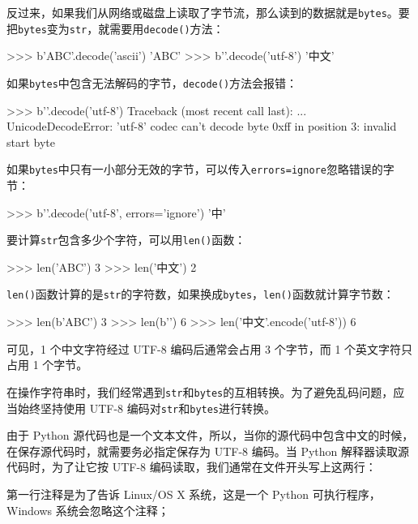 反过来，如果我们从网络或磁盘上读取了字节流，那么读到的数据就是\texttt{bytes}。要把\texttt{bytes}变为\texttt{str}，就需要用\texttt{decode()}方法：

\begin{pythoncode}
>>> b'ABC'.decode('ascii')
'ABC'
>>> b'\xad{}'.decode('utf-8')
'中文'
\end{pythoncode}

如果\texttt{bytes}中包含无法解码的字节，\texttt{decode()}方法会报错：

\begin{pythoncode}
>>> b'\xad\xff'.decode('utf-8')
Traceback (most recent call last):
  ...
UnicodeDecodeError: 'utf-8' codec can't decode byte 0xff in position 3: invalid start byte
\end{pythoncode}

如果\texttt{bytes}中只有一小部分无效的字节，可以传入\texttt{errors=\textquotesingle{}ignore\textquotesingle{}}忽略错误的字节：

\begin{pythoncode}
>>> b'\xad\xff'.decode('utf-8', errors='ignore')
'中'
\end{pythoncode}

要计算\texttt{str}包含多少个字符，可以用\texttt{len()}函数：

\begin{pythoncode}
>>> len('ABC')
3
>>> len('中文')
2
\end{pythoncode}

\texttt{len()}函数计算的是\texttt{str}的字符数，如果换成\texttt{bytes}，\texttt{len()}函数就计算字节数：

\begin{pythoncode}
>>> len(b'ABC')
3
>>> len(b'\xad{}')
6
>>> len('中文'.encode('utf-8'))
6
\end{pythoncode}

可见，1 个中文字符经过 UTF-8 编码后通常会占用 3 个字节，而 1
个英文字符只占用 1 个字节。

在操作字符串时，我们经常遇到\texttt{str}和\texttt{bytes}的互相转换。为了避免乱码问题，应当始终坚持使用
UTF-8 编码对\texttt{str}和\texttt{bytes}进行转换。

由于 Python
源代码也是一个文本文件，所以，当你的源代码中包含中文的时候，在保存源代码时，就需要务必指定保存为
UTF-8 编码。当 Python 解释器读取源代码时，为了让它按 UTF-8
编码读取，我们通常在文件开头写上这两行：

第一行注释是为了告诉 Linux/OS X 系统，这是一个 Python
可执行程序，Windows 系统会忽略这个注释；

